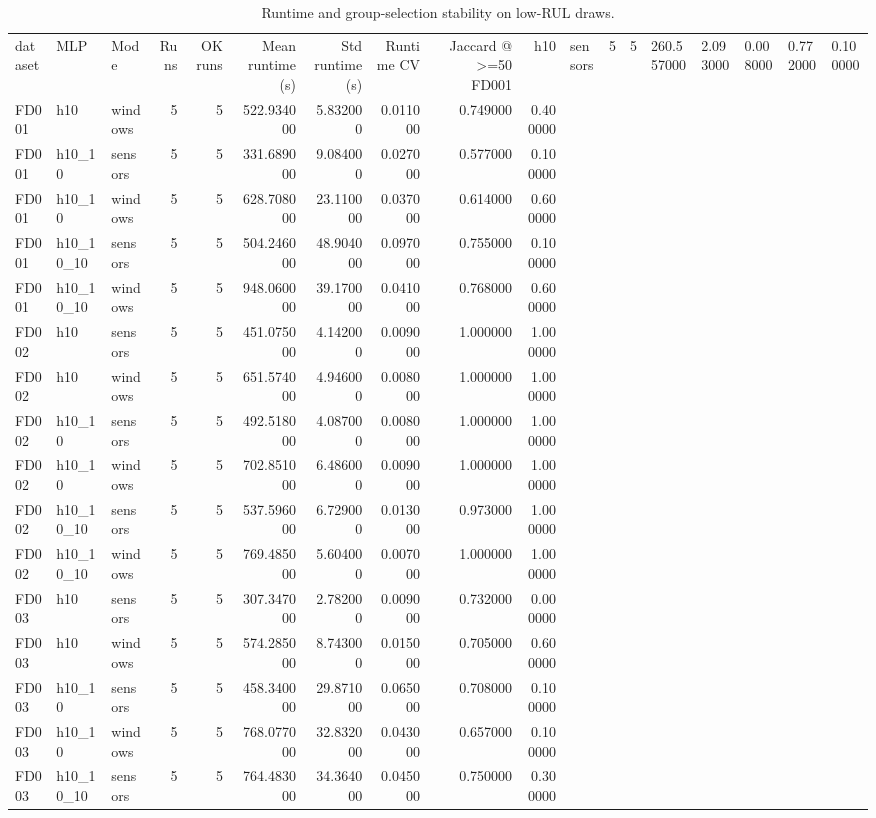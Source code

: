 \begin{table}
\caption{Runtime and group-selection stability on low-RUL draws.}
\begin{tabular}{lllrrrrrrr}
\toprule
dataset & MLP & Mode & Runs & OK runs & Mean runtime (s) & Std runtime (s) & Runtime CV & Jaccard @ >=50%
\midrule
FD001 & h10 & sensors & 5 & 5 & 260.557000 & 2.093000 & 0.008000 & 0.772000 & 0.100000 \\
FD001 & h10 & windows & 5 & 5 & 522.934000 & 5.832000 & 0.011000 & 0.749000 & 0.400000 \\
FD001 & h10_10 & sensors & 5 & 5 & 331.689000 & 9.084000 & 0.027000 & 0.577000 & 0.100000 \\
FD001 & h10_10 & windows & 5 & 5 & 628.708000 & 23.110000 & 0.037000 & 0.614000 & 0.600000 \\
FD001 & h10_10_10 & sensors & 5 & 5 & 504.246000 & 48.904000 & 0.097000 & 0.755000 & 0.100000 \\
FD001 & h10_10_10 & windows & 5 & 5 & 948.060000 & 39.170000 & 0.041000 & 0.768000 & 0.600000 \\
FD002 & h10 & sensors & 5 & 5 & 451.075000 & 4.142000 & 0.009000 & 1.000000 & 1.000000 \\
FD002 & h10 & windows & 5 & 5 & 651.574000 & 4.946000 & 0.008000 & 1.000000 & 1.000000 \\
FD002 & h10_10 & sensors & 5 & 5 & 492.518000 & 4.087000 & 0.008000 & 1.000000 & 1.000000 \\
FD002 & h10_10 & windows & 5 & 5 & 702.851000 & 6.486000 & 0.009000 & 1.000000 & 1.000000 \\
FD002 & h10_10_10 & sensors & 5 & 5 & 537.596000 & 6.729000 & 0.013000 & 0.973000 & 1.000000 \\
FD002 & h10_10_10 & windows & 5 & 5 & 769.485000 & 5.604000 & 0.007000 & 1.000000 & 1.000000 \\
FD003 & h10 & sensors & 5 & 5 & 307.347000 & 2.782000 & 0.009000 & 0.732000 & 0.000000 \\
FD003 & h10 & windows & 5 & 5 & 574.285000 & 8.743000 & 0.015000 & 0.705000 & 0.600000 \\
FD003 & h10_10 & sensors & 5 & 5 & 458.340000 & 29.871000 & 0.065000 & 0.708000 & 0.100000 \\
FD003 & h10_10 & windows & 5 & 5 & 768.077000 & 32.832000 & 0.043000 & 0.657000 & 0.100000 \\
FD003 & h10_10_10 & sensors & 5 & 5 & 764.483000 & 34.364000 & 0.045000 & 0.750000 & 0.300000 \\

\end{tabular}
\end{table}

